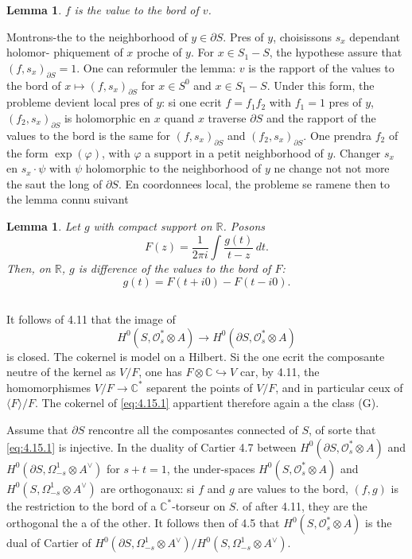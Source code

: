 \documentclass[12pt,a4paper]{article}
\theoremstyle{plain}
\newtheorem{lemma}[theorem]{Lemma}
\theoremstyle{definition}
\theoremstyle{remark}
\newcommand{\cO}{\mathcal{O}}
\newcommand{\C}{\mathbb{C}}
\newcommand{\R}{\mathbb{R}}
\providecommand{\cO}{\mathcal{O}}
\providecommand{\R}{\mathrm{R}}
\begin{document}
\begin{lemma}
$f$ is the value to the bord of $v$.
\end{lemma}

Montrons-the to the neighborhood of $y \in \partial S$. Pres of $y$, choisissons $s_x$ dependant holomor-
phiquement of $x$ proche of $y$. For $x \in S_1 - S$, the hypothese assure that $(f, s_x)_{\partial S} = 1$.
One can reformuler the lemma: $v$ is the rapport of the values to the bord of $x \mapsto (f, s_x)_{\partial S}$
for $x \in S^0$ and $x \in S_1 - S$. Under this form, the probleme devient local pres of $y$: si one
ecrit $f = f_1 f_2$ with $f_1 = 1$ pres of $y$, $(f_2, s_x)_{\partial S}$ is holomorphic en $x$ quand $x$ traverse
$\partial S$ and the rapport of the values to the bord is the same for $(f, s_x)_{\partial S}$ and $(f_2, s_x)_{\partial S}$. One
prendra $f_2$ of the form $\exp(\varphi)$, with $\varphi$ a support in a petit neighborhood of $y$. Changer
$s_x$ en $s_x \cdot \psi$ with $\psi$ holomorphic to the neighborhood of $y$ ne change not not more the saut the long
of $\partial S$. En coordonnees local, the probleme se ramene then to the lemma connu suivant

\begin{lemma}
Let $g$ with compact support on $\R$. Posons
\[
F(z) = \frac{1}{2\pi i} \int \frac{g(t)}{t - z} \, dt.
\]
Then, on $\R$, $g$ is difference of the values to the bord of $F$:
\[
g(t) = F(t + i0) - F(t - i0).
\]
\end{lemma}

\subsection{}

It follows of 4.11 that the image of
\begin{equation}\label{eq:4.15.1}
H^0(S, \cO_s^* \otimes A) \to H^0(\partial S, \cO_s^* \otimes A)
\end{equation}
is closed. The cokernel is model on a Hilbert. Si the one ecrit the composante neutre
of the kernel as $V/F$, one has $F \otimes \C \hookrightarrow V$ car, by 4.11, the homomorphismes $V/F \to \C^*$
separent the points of $V/F$, and in particular ceux of $\langle F \rangle/F$. The cokernel of \eqref{eq:4.15.1}
appartient therefore again a the class (G).

\begin{scholie}
Assume that $\partial S$ rencontre all the composantes connected of $S$,
of sorte that \eqref{eq:4.15.1} is injective. In the duality of Cartier 4.7 between $H^0(\partial S, \cO_s^* \otimes A)$
and $H^0(\partial S, \Omega^1_{-s} \otimes A^\vee)$ for $s + t = 1$, the under-spaces $H^0(S, \cO_s^* \otimes A)$ and $H^0(S, \Omega^1_{-s} \otimes A^\vee)$
are orthogonaux: si $f$ and $g$ are values to the bord, $(f,g)$ is the restriction to the bord of a
$\C^*$-torseur on $S$. of after 4.11, they are the orthogonal the a of the other. It follows then of 4.5
that $H^0(S, \cO_s^* \otimes A)$ is the dual of Cartier of $H^0(\partial S, \Omega^1_{-s} \otimes A^\vee)/H^0(S, \Omega^1_{-s} \otimes A^\vee)$.
\end{scholie}
\end{document}
